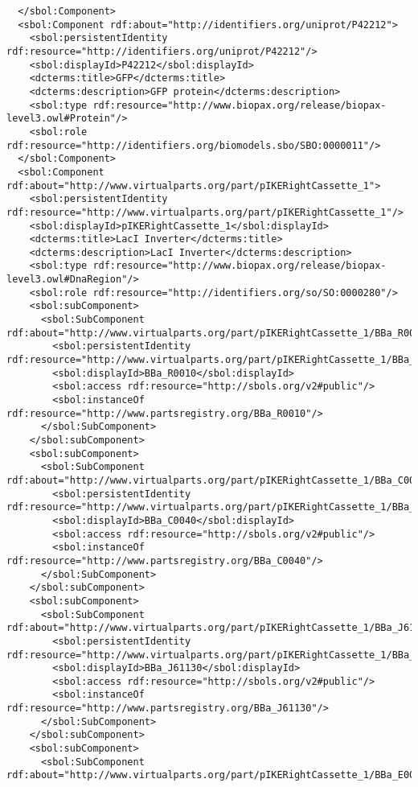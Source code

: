 \begin{lstlisting}
  </sbol:Component>
  <sbol:Component rdf:about="http://identifiers.org/uniprot/P42212">
    <sbol:persistentIdentity rdf:resource="http://identifiers.org/uniprot/P42212"/>
    <sbol:displayId>P42212</sbol:displayId>
    <dcterms:title>GFP</dcterms:title>
    <dcterms:description>GFP protein</dcterms:description>
    <sbol:type rdf:resource="http://www.biopax.org/release/biopax-level3.owl#Protein"/>
    <sbol:role rdf:resource="http://identifiers.org/biomodels.sbo/SBO:0000011"/>
  </sbol:Component>
  <sbol:Component rdf:about="http://www.virtualparts.org/part/pIKERightCassette_1">
    <sbol:persistentIdentity rdf:resource="http://www.virtualparts.org/part/pIKERightCassette_1"/>
    <sbol:displayId>pIKERightCassette_1</sbol:displayId>
    <dcterms:title>LacI Inverter</dcterms:title>
    <dcterms:description>LacI Inverter</dcterms:description>
    <sbol:type rdf:resource="http://www.biopax.org/release/biopax-level3.owl#DnaRegion"/>
    <sbol:role rdf:resource="http://identifiers.org/so/SO:0000280"/>
    <sbol:subComponent>
      <sbol:SubComponent rdf:about="http://www.virtualparts.org/part/pIKERightCassette_1/BBa_R0010">
        <sbol:persistentIdentity rdf:resource="http://www.virtualparts.org/part/pIKERightCassette_1/BBa_R0010"/>
        <sbol:displayId>BBa_R0010</sbol:displayId>
        <sbol:access rdf:resource="http://sbols.org/v2#public"/>
        <sbol:instanceOf rdf:resource="http://www.partsregistry.org/BBa_R0010"/>
      </sbol:SubComponent>
    </sbol:subComponent>
    <sbol:subComponent>
      <sbol:SubComponent rdf:about="http://www.virtualparts.org/part/pIKERightCassette_1/BBa_C0040">
        <sbol:persistentIdentity rdf:resource="http://www.virtualparts.org/part/pIKERightCassette_1/BBa_C0040"/>
        <sbol:displayId>BBa_C0040</sbol:displayId>
        <sbol:access rdf:resource="http://sbols.org/v2#public"/>
        <sbol:instanceOf rdf:resource="http://www.partsregistry.org/BBa_C0040"/>
      </sbol:SubComponent>
    </sbol:subComponent>
    <sbol:subComponent>
      <sbol:SubComponent rdf:about="http://www.virtualparts.org/part/pIKERightCassette_1/BBa_J61130">
        <sbol:persistentIdentity rdf:resource="http://www.virtualparts.org/part/pIKERightCassette_1/BBa_J61130"/>
        <sbol:displayId>BBa_J61130</sbol:displayId>
        <sbol:access rdf:resource="http://sbols.org/v2#public"/>
        <sbol:instanceOf rdf:resource="http://www.partsregistry.org/BBa_J61130"/>
      </sbol:SubComponent>
    </sbol:subComponent>
    <sbol:subComponent>
      <sbol:SubComponent rdf:about="http://www.virtualparts.org/part/pIKERightCassette_1/BBa_E0040">

\end{lstlisting}
